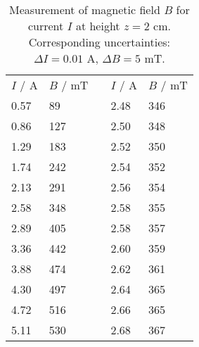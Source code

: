\begin{table}[htdp]
\centering
    \begin{tabular}{|p{1.34cm}|p{2.16cm}|p{0.8cm}|p{1.34cm}|p{2.16cm}|}
        \cline{1-2}\cline{4-5}
        $I$ / A \cellcolor{LightCyan}& $B$ / mT \cellcolor{LightCyan}&&
        $I$ / A \cellcolor{LightCyan}& $B$ / mT \cellcolor{LightCyan}\\ 
        \cline{1-2}\cline{4-5}
        0.57 & 89 &&2.48 & 346 \\ 
        0.86 & 127 &&2.50 & 348 \\ 
        1.29 & 183 &&2.52 & 350 \\ 
        1.74 & 242 &&2.54 & 352 \\ 
        2.13 & 291 &&2.56 & 354 \\ 
        2.58 & 348 &&2.58 & 355 \\ 
        2.89 & 405 &&2.58 & 357 \\ 
        3.36 & 442 &&2.60 & 359 \\ 
        3.88 & 474 &&2.62 & 361 \\ 
        4.30 & 497 &&2.64 & 365 \\ 
        4.72 & 516 &&2.66 & 365 \\ 
        5.11 & 530 &&2.68 & 367 \\ 
        \cline{1-2}\cline{4-5}
    \end{tabular}
    \caption{
        Measurement of magnetic field $B$ for current $I$ at height $z = 2$ cm. Corresponding uncertainties: $\Delta I = 0.01$ A, $\Delta B = 5$ mT.
        }
    \label{tab:b_I}
\end{table}
